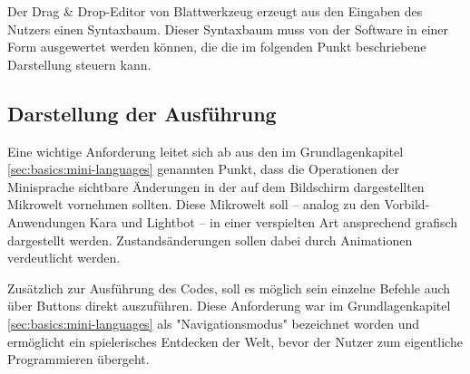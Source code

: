 Der Drag \& Drop-Editor von Blattwerkzeug  erzeugt aus den Eingaben des Nutzers einen Syntaxbaum. Dieser Syntaxbaum muss von der Software in einer Form ausgewertet werden können, die die im folgenden Punkt beschriebene Darstellung steuern kann.

\subsection{Darstellung der Ausführung}
\label{sec:requirements:world:display}

Eine wichtige Anforderung leitet sich ab aus den im Grundlagenkapitel \ref{sec:basics:mini-languages} genannten Punkt, dass die Operationen der Minisprache sichtbare Änderungen in der auf dem Bildschirm dargestellten Mikrowelt vornehmen sollten. Diese Mikrowelt soll -- analog zu den Vorbild-Anwendungen Kara und Lightbot -- in einer verspielten Art ansprechend grafisch dargestellt werden. Zustandsänderungen sollen dabei durch Animationen verdeutlicht werden.

Zusätzlich zur Ausführung des Codes, soll es möglich sein einzelne Befehle auch über Buttons direkt auszuführen. Diese Anforderung war im Grundlagenkapitel \ref{sec:basics:mini-languages} als "Navigationsmodus" bezeichnet worden und ermöglicht ein spielerisches Entdecken der Welt, bevor der Nutzer zum eigentliche Programmieren übergeht.
